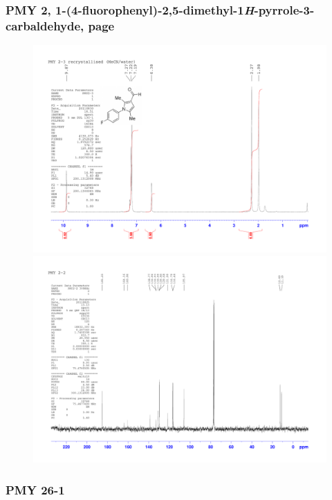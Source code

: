 \documentclass[12pt, a4paper,titlepage]{article}
\begin{document}
{\subsubsection*{PMY 2, 1-(4-fluorophenyl)-2,5-dimethyl-1\emph{H}-pyrrole-3-carbaldehyde, page \pageref{exp:PMY2}}
\label{spec:PMY2}
	\begin{figure}[H] 
	\begin{center}
	\includegraphics[width=14.5cm]{expdata/PMY2/1H}
	\includegraphics[width=14.5cm]{expdata/PMY2/13C}
	\end{center}
	\end{figure}

\subsubsection*{PMY 26-1}

}
\end{document}
